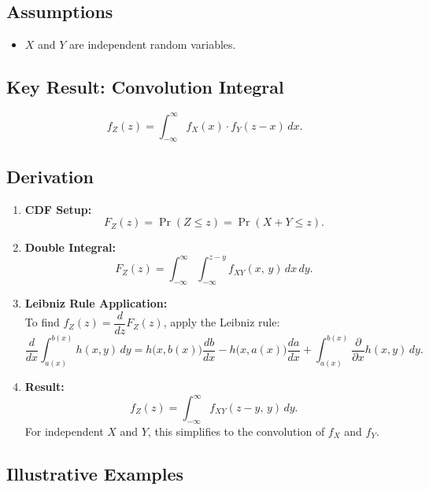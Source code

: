 \documentclass{article}
\begin{document}
\subsection*{Assumptions}
\begin{itemize}
    \item $X$ and $Y$ are independent random variables.
\end{itemize}

\subsection*{Key Result: Convolution Integral}
\begin{equation}
    f_Z(z) = \int_{-\infty}^{\infty} f_X(x)\cdot f_Y(z - x)\, dx.
\end{equation}

\subsection*{Derivation}
\begin{enumerate}
    \item \textbf{CDF Setup:}
    \[
        F_Z(z) = \Pr(Z \leq z) = \Pr(X + Y \leq z).
    \]

    \item \textbf{Double Integral:}
    \[
        F_Z(z) = \int_{-\infty}^{\infty}\int_{-\infty}^{z - y}
                 f_{XY}(x,\,y)\,dx\,dy.
    \]

    \item \textbf{Leibniz Rule Application:}\\
    To find $f_Z(z) = \dfrac{d}{dz}F_Z(z)$, apply the Leibniz rule:
    \[
        \frac{d}{dx}\int_{a(x)}^{b(x)} h(x,y)\,dy
        = h\bigl(x,b(x)\bigr)\frac{db}{dx}
          - h\bigl(x,a(x)\bigr)\frac{da}{dx}
          + \int_{a(x)}^{b(x)}\frac{\partial}{\partial x}h(x,y)\,dy.
    \]

    \item \textbf{Result:}
    \[
        f_Z(z) = \int_{-\infty}^{\infty} f_{XY}(z - y,\,y)\,dy.
    \]
    For independent $X$ and $Y$, this simplifies to the convolution of 
    $f_X$ and $f_Y$.
\end{enumerate}

\subsection*{Illustrative Examples}
\end{document}
